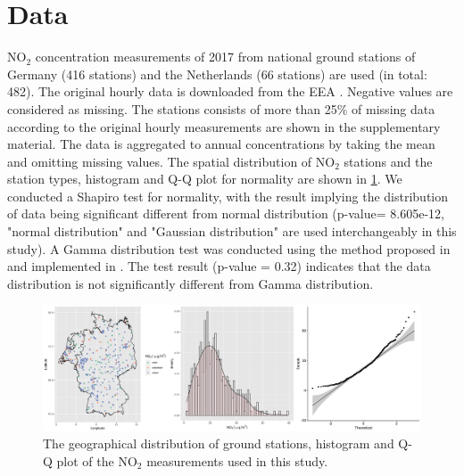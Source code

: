 \documentclass{article}
\begin{document}
 
\section{Data}
NO$_2$ concentration measurements of 2017 from national ground stations of Germany (416 stations) and the Netherlands (66 stations) are used (in total: 482). The original hourly data is downloaded from the EEA \citep[European Environment Agency,][]{nelson1999european,EEA}. Negative values are considered as missing. The stations consists of  more than 25\% of missing data according to the original hourly measurements are shown in the supplementary material.  The data is aggregated to annual concentrations by taking the mean and omitting missing values. The spatial distribution of NO$_2$ stations and the station types, histogram and Q-Q plot for normality are shown in \cref{fig:histqq}. %
We conducted a Shapiro test for normality, with the result implying the distribution of data being significant different from normal distribution (p-value= 8.605e-12, "normal distribution" and "Gaussian distribution" are used interchangeably in this study).
A Gamma distribution test was conducted using the method proposed in \cite{villasenor2015variance} and implemented in \cite{goft}.  The test result (p-value = 0.32) indicates that the data distribution is not significantly different from Gamma distribution.

\begin{figure}
    \centering
    \includegraphics[scale=0.06]{fig/histqq_NO2.png}
    \caption{The geographical distribution of ground stations, histogram and Q-Q plot of the NO$_2$ measurements used in this study.}
    \label{fig:histqq}
\end{figure}{}
\end{document}
